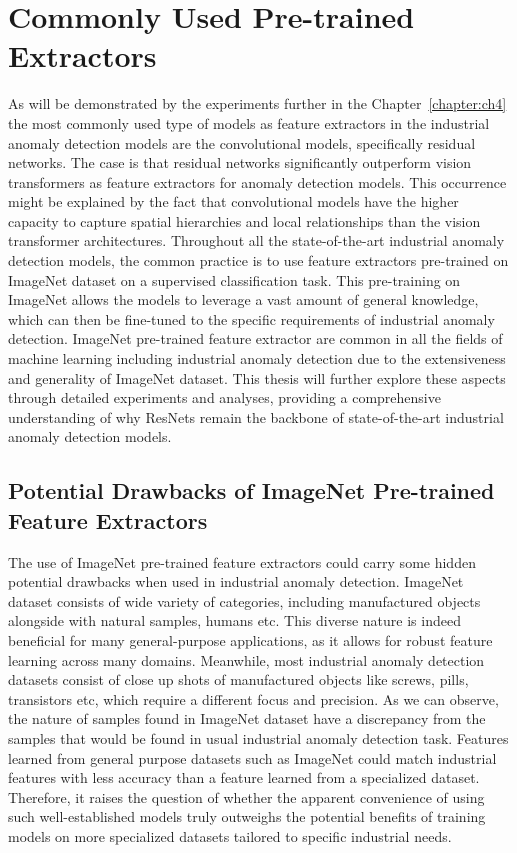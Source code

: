 \section{Commonly Used Pre-trained Extractors}
\label{common extractors}
As will be demonstrated by the experiments further in the Chapter~\ref{chapter:ch4} the most commonly used type of models as feature extractors in the industrial anomaly detection models are the convolutional models, specifically residual networks. The case is that residual networks significantly outperform vision transformers as feature extractors for anomaly detection models. This occurrence might be explained by the fact that convolutional models have the higher capacity to capture spatial hierarchies and local relationships than the vision transformer architectures. Throughout all the state-of-the-art industrial anomaly detection models, the common practice is to use feature extractors pre-trained on ImageNet dataset on a supervised classification task. This pre-training on ImageNet allows the models to leverage a vast amount of general knowledge, which can then be fine-tuned to the specific requirements of industrial anomaly detection. ImageNet pre-trained feature extractor are common in all the fields of machine learning including industrial anomaly detection due to the extensiveness and generality of ImageNet dataset. This thesis will further explore these aspects through detailed experiments and analyses, providing a comprehensive understanding of why ResNets remain the backbone of state-of-the-art industrial anomaly detection models.

\subsection{Potential Drawbacks of ImageNet Pre-trained Feature Extractors}
\label{imagenet pre-trained}
The use of ImageNet pre-trained feature extractors could carry some hidden potential drawbacks when used in industrial anomaly detection. ImageNet dataset consists of wide variety of categories, including manufactured objects alongside with natural samples, humans etc. This diverse nature is indeed beneficial for many general-purpose applications, as it allows for robust feature learning across many domains. Meanwhile, most industrial anomaly detection datasets consist of close up shots of manufactured objects like screws, pills, transistors etc, which require a different focus and precision. As we can observe, the nature of samples found in ImageNet dataset have a discrepancy from the samples that would be found in usual industrial anomaly detection task. Features learned from general purpose datasets such as ImageNet could match industrial features with less accuracy than a feature learned from a specialized dataset. Therefore, it raises the question of whether the apparent convenience of using such well-established models truly outweighs the potential benefits of training models on more specialized datasets tailored to specific industrial needs.

